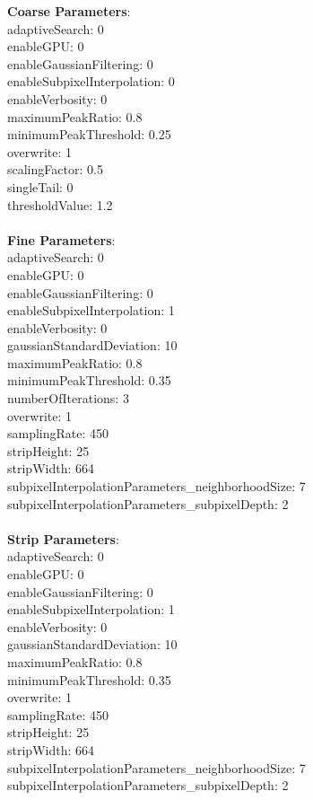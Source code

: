 \documentclass[11pt]{article}
\begin{document}
\textbf{Coarse Parameters}: \\
adaptiveSearch: 0\\
enableGPU: 0\\
enableGaussianFiltering: 0\\
enableSubpixelInterpolation: 0\\
enableVerbosity: 0\\
maximumPeakRatio: 0.8\\
minimumPeakThreshold: 0.25\\
overwrite: 1\\
scalingFactor: 0.5\\
singleTail: 0\\
thresholdValue: 1.2\\
\\
\textbf{Fine Parameters}: \\
adaptiveSearch: 0\\
enableGPU: 0\\
enableGaussianFiltering: 0\\
enableSubpixelInterpolation: 1\\
enableVerbosity: 0\\
gaussianStandardDeviation: 10\\
maximumPeakRatio: 0.8\\
minimumPeakThreshold: 0.35\\
numberOfIterations: 3\\
overwrite: 1\\
samplingRate: 450\\
stripHeight: 25\\
stripWidth: 664\\
subpixelInterpolationParameters\_neighborhoodSize: 7\\
subpixelInterpolationParameters\_subpixelDepth: 2\\
\\
\textbf{Strip Parameters}: \\
adaptiveSearch: 0\\
enableGPU: 0\\
enableGaussianFiltering: 0\\
enableSubpixelInterpolation: 1\\
enableVerbosity: 0\\
gaussianStandardDeviation: 10\\
maximumPeakRatio: 0.8\\
minimumPeakThreshold: 0.35\\
overwrite: 1\\
samplingRate: 450\\
stripHeight: 25\\
stripWidth: 664\\
subpixelInterpolationParameters\_neighborhoodSize: 7\\
subpixelInterpolationParameters\_subpixelDepth: 2\\
\\
\newpage
\end{document}
